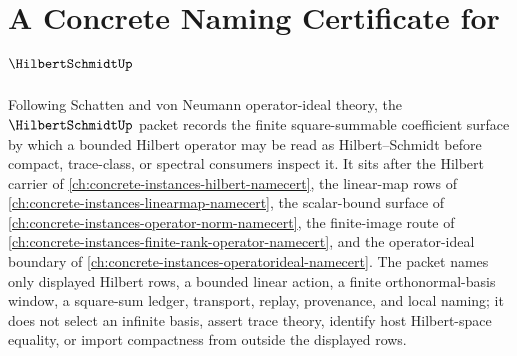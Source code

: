 \chapter{A Concrete Naming Certificate for $\HilbertSchmidtUp$}
\label{ch:concrete-instances-hilbert-schmidt-namecert}

Following Schatten and von Neumann operator-ideal theory, the $\HilbertSchmidtUp$ packet records the finite square-summable coefficient surface by which a bounded Hilbert operator may be read as Hilbert--Schmidt before compact, trace-class, or spectral consumers inspect it. It sits after the Hilbert carrier of \autoref{ch:concrete-instances-hilbert-namecert}, the linear-map rows of \autoref{ch:concrete-instances-linearmap-namecert}, the scalar-bound surface of \autoref{ch:concrete-instances-operator-norm-namecert}, the finite-image route of \autoref{ch:concrete-instances-finite-rank-operator-namecert}, and the operator-ideal boundary of \autoref{ch:concrete-instances-operatorideal-namecert}. The packet names only displayed Hilbert rows, a bounded linear action, a finite orthonormal-basis window, a square-sum ledger, transport, replay, provenance, and local naming; it does not select an infinite basis, assert trace theory, identify host Hilbert-space equality, or import compactness from outside the displayed rows.

